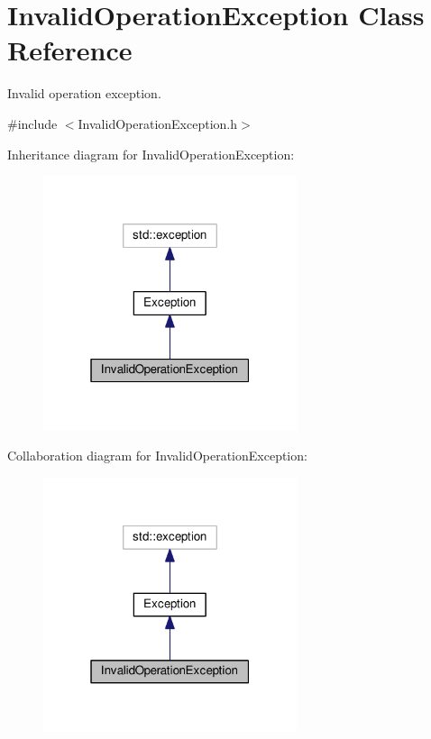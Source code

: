 \hypertarget{classInvalidOperationException}{}\section{Invalid\+Operation\+Exception Class Reference}
\label{classInvalidOperationException}


Invalid operation exception.  




{\ttfamily \#include $<$Invalid\+Operation\+Exception.\+h$>$}



Inheritance diagram for Invalid\+Operation\+Exception\+:\nopagebreak
\begin{figure}[H]
\begin{center}
\leavevmode
\includegraphics[width=211pt]{classInvalidOperationException__inherit__graph}
\end{center}
\end{figure}


Collaboration diagram for Invalid\+Operation\+Exception\+:\nopagebreak
\begin{figure}[H]
\begin{center}
\leavevmode
\includegraphics[width=211pt]{classInvalidOperationException__coll__graph}
\end{center}
\end{figure}
